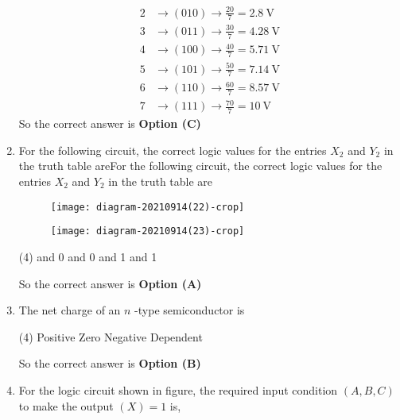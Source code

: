 \begin{enumerate}
\begin{answer}
\begin{align*}
2& \rightarrow(010) \rightarrow \frac{20}{7}=2.8 \mathrm{~V}\\
3& \rightarrow(011) \rightarrow \frac{30}{7}=4.28 \mathrm{~V}\\
4& \rightarrow(100) \rightarrow \frac{40}{7}=5.71 \mathrm{~V}\\
5& \rightarrow(101) \rightarrow \frac{50}{7}=7.14 \mathrm{~V}\\
6& \rightarrow(110) \rightarrow \frac{60}{7}=8.57 \mathrm{~V}\\
7& \rightarrow(111) \rightarrow \frac{70}{7}=10 \mathrm{~V}
\end{align*}
So the correct answer is \textbf{Option (C)}
\end{answer}
\item 	For the following circuit, the correct logic values for the entries $X_{2}$ and $Y_{2}$ in the truth table areFor the following circuit, the correct logic values for the entries $X_{2}$ and $Y_{2}$ in the truth table are
{}\\
\begin{minipage}{0.45\textwidth}
\begin{figure}[H]
	\centering
	\texttt{[image: diagram-20210914(22)-crop]}
\end{figure}
\end{minipage}
\begin{minipage}{0.45\textwidth}
\begin{figure}[H]
	\centering
	\texttt{[image: diagram-20210914(23)-crop]}
\end{figure}
\end{minipage}
\begin{tasks}(4)
 and 0
 and 0 
 and 1
 and 1
\end{tasks}
\begin{answer}
So the correct answer is \textbf{Option (A)} 
\end{answer}
	\item The net charge of an $n$ -type semiconductor is
\begin{tasks}(4)
\task[\textbf{A.}] Positive
\task[\textbf{B.}] Zero
\task[\textbf{C.}] Negative
\task[\textbf{D.}] Dependent
\end{tasks}
\begin{answer}
So the correct answer is \textbf{Option (B)}
\end{answer}
	\item For the logic circuit shown in figure, the required input condition $(A, B, C)$ to make the output $(X)=1$ is,

\end{enumerate}
